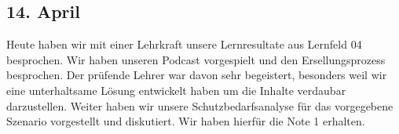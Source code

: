 \subsection{14. April}
Heute haben wir mit einer Lehrkraft unsere Lernresultate aus Lernfeld 04 besprochen. Wir haben unseren Podcast vorgespielt und den Ersellungsprozess besprochen. Der prüfende Lehrer war davon sehr begeistert, besonders weil wir eine unterhaltsame Lösung entwickelt haben um die Inhalte verdaubar darzustellen. Weiter haben wir unsere Schutzbedarfsanalyse für das vorgegebene Szenario vorgestellt und diskutiert. Wir haben hierfür die Note 1 erhalten.